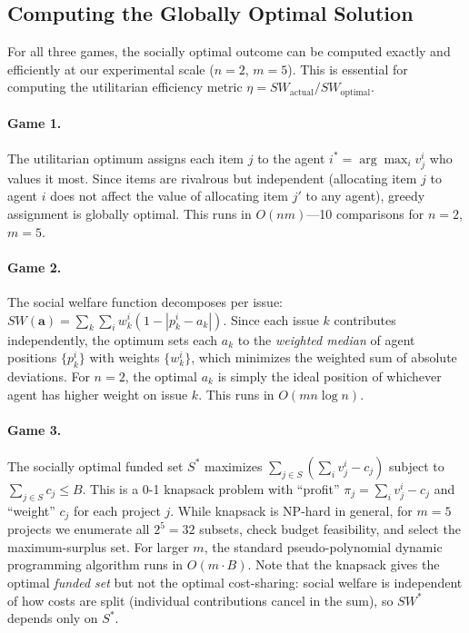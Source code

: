 \subsection{Computing the Globally Optimal Solution}
\label{sec:optimal_computation}

For all three games, the socially optimal outcome can be computed exactly and efficiently at our experimental scale ($n = 2$, $m = 5$).
This is essential for computing the utilitarian efficiency metric $\eta = SW_{\text{actual}} / SW_{\text{optimal}}$.

\paragraph{Game 1.}
The utilitarian optimum assigns each item $j$ to the agent $i^* = \arg\max_i v^i_j$ who values it most.
Since items are rivalrous but independent (allocating item $j$ to agent $i$ does not affect the value of allocating item $j'$ to any agent), greedy assignment is globally optimal.
This runs in $O(nm)$---10 comparisons for $n=2$, $m=5$.

\paragraph{Game 2.}
The social welfare function decomposes per issue: $SW(\bm{a}) = \sum_k \sum_i w^i_k (1 - |p^i_k - a_k|)$.
Since each issue $k$ contributes independently, the optimum sets each $a_k$ to the \emph{weighted median} of agent positions $\{p^i_k\}$ with weights $\{w^i_k\}$, which minimizes the weighted sum of absolute deviations.
For $n = 2$, the optimal $a_k$ is simply the ideal position of whichever agent has higher weight on issue $k$.
This runs in $O(mn \log n)$.

\paragraph{Game 3.}
The socially optimal funded set $S^*$ maximizes $\sum_{j \in S} (\sum_i v^i_j - c_j)$ subject to $\sum_{j \in S} c_j \leq B$.
This is a 0-1 knapsack problem with ``profit'' $\pi_j = \sum_i v^i_j - c_j$ and ``weight'' $c_j$ for each project $j$.
While knapsack is NP-hard in general, for $m = 5$ projects we enumerate all $2^5 = 32$ subsets, check budget feasibility, and select the maximum-surplus set.
For larger $m$, the standard pseudo-polynomial dynamic programming algorithm runs in $O(m \cdot B)$.
Note that the knapsack gives the optimal \emph{funded set} but not the optimal cost-sharing: social welfare is independent of how costs are split (individual contributions cancel in the sum), so $SW^*$ depends only on $S^*$.

